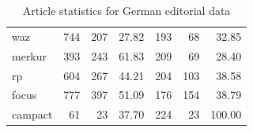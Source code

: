 \begin{table}
\begin{tabular}{lrrrrrr}
		waz                &            744 &               207 &            27.82 &                 193 &                 68 &                 32.85 \\
		merkur             &            393 &               243 &            61.83 &                 209 &                 69 &                 28.40 \\
		rp                 &            604 &               267 &            44.21 &                 204 &                103 &                 38.58 \\
		focus              &            777 &               397 &            51.09 &                 176 &                154 &                 38.79 \\
		campact            &             61 &                23 &            37.70 &                 224 &                 23 &                100.00 \\ \bottomrule
	\end{tabular}
	\caption{Article statistics for German editorial data} 
\end{table}

